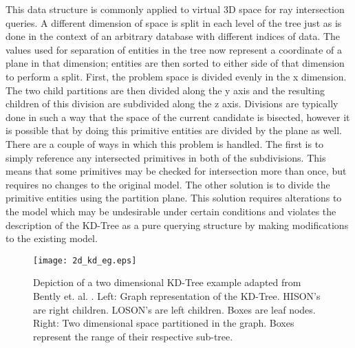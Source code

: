 This data structure is commonly applied to virtual 3D space for ray intersection
queries. A different dimension of space is split in each level of the tree just
as is done in the context of an arbitrary database with different indices of
data. The values used for separation of entities in the tree now represent a
coordinate of a plane in that dimension; entities are then sorted to either side
of that dimension to perform a split. First, the problem space is divided evenly
in the x dimension. The two child partitions are then divided along the y axis
and the resulting children of this division are subdivided along the z
axis. Divisions are typically done in such a way that the space of the current
candidate is bisected, however it is possible that by doing this primitive
entities are divided by the plane as well. There are a couple of ways in which
this problem is handled. The first is to simply reference any intersected
primitives in both of the subdivisions. This means that some primitives may be
checked for intersection more than once, but requires no changes to the original
model. The other solution is to divide the primitive entities using the
partition plane.  This solution requires alterations to the model which may be
undesirable under certain conditions and violates the description of the KD-Tree
as a pure querying structure by making modifications to the existing model.

\begin{figure}[H]
  \centering
  \texttt{[image: 2d\_kd\_eg.eps]}
  \caption{Depiction of a two dimensional KD-Tree example adapted from Bently
    et. al. \cite{Bentley_1975}. Left: Graph representation of the
    KD-Tree. HISON's are right children. LOSON's are left children. Boxes are
    leaf nodes. Right: Two dimensional space partitioned in the graph. Boxes represent
    the range of their respective sub-tree.}
  \label{fig:2D_kd_tree}
\end{figure}

